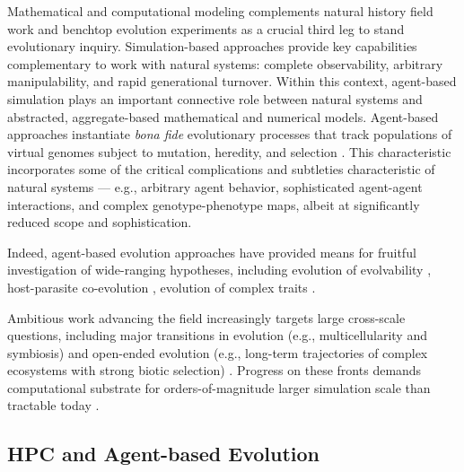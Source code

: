 Mathematical and computational modeling complements natural history field work and benchtop evolution experiments as a crucial third leg to stand evolutionary inquiry.
Simulation-based approaches provide key capabilities complementary to work with natural systems: complete observability, arbitrary manipulability, and rapid generational turnover.
Within this context, agent-based simulation plays an important connective role between natural systems and abstracted, aggregate-based mathematical and numerical models.
Agent-based approaches instantiate \textit{bona fide} evolutionary processes that track populations of virtual genomes subject to mutation, heredity, and selection \citep{pennock2007models}.
This characteristic incorporates some of the critical complications and subtleties characteristic of natural systems --- e.g., arbitrary agent behavior, sophisticated agent-agent interactions, and complex genotype-phenotype maps, albeit at significantly reduced scope and sophistication.

Indeed, agent-based evolution approaches have provided means for fruitful investigation of wide-ranging hypotheses, including evolution of evolvability \citep{wilke2001evolution}, host-parasite co-evolution \citep{zaman2014coevolution}, evolution of complex traits \citep{lenski2003evolutionary}.

Ambitious work advancing the field increasingly targets large cross-scale questions, including major transitions in evolution (e.g., multicellularity and symbiosis) \citep{goldsby2020major,vostinar2021symbiosis} and open-ended evolution (e.g., long-term trajectories of complex ecosystems with strong biotic selection) \citep{stanley2019open,taylor2016open}.
Progress on these fronts demands computational substrate for orders-of-magnitude larger simulation scale than tractable today \citep{moreno2022exploring,channon2019maximum}.


\subsection{HPC and Agent-based Evolution}


